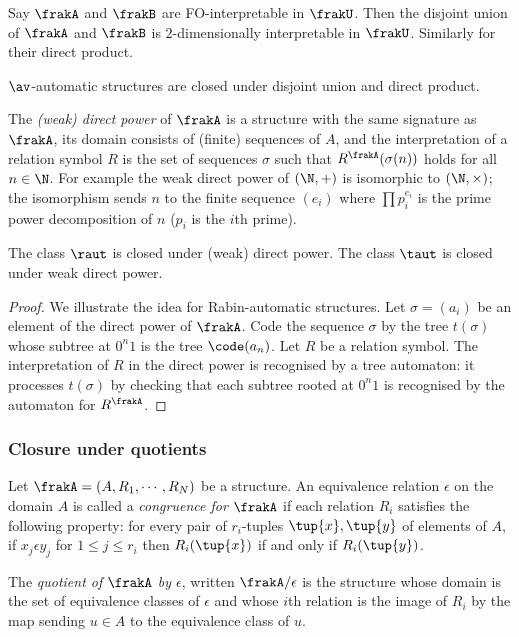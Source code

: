 Say $\frakA$ and $\frakB$ are FO-interpretable in $\frakU$. Then the disjoint union of $\frakA$ and $\frakB$ is $2$-dimensionally interpretable in $\frakU$. Similarly for their direct product.

\begin{corollary}
$\av$-automatic structures are closed under disjoint union and direct product.
\end{corollary}

The {\em (weak) direct power} of $\frakA$ is a structure with the same signature as $\frakA$, its domain consists 
of (finite) sequences of $A$, and the 
interpretation of a relation symbol $R$ is the set of sequences $\sigma$ such that $R^\frakA(\sigma(n))$ holds for all $n \in \N$.
For example the weak direct power of $(\N,+)$ is isomorphic to $(\N,\times)$; the isomorphism sends $n$ to  the finite sequence $(e_i)$ where
$ \prod p_i^{e_i}$ is the prime power decomposition of $n$ ($p_i$ is the $i$th prime).
 
\begin{proposition}
The class $\raut$ is closed under (weak) direct power. The class $\taut$ is closed under weak direct power.
\end{proposition}

\begin{proof}
We illustrate the idea for Rabin-automatic structures.
Let $\sigma = (a_i)$ be an element of the direct power of $\frakA$.
Code the sequence $\sigma$ by the tree $t(\sigma)$ whose subtree at $0^n1$ is the tree $\code(a_n)$.
Let $R$ be a relation symbol. The interpretation of $R$ in the direct power is recognised by a tree automaton: it  processes $t(\sigma)$ by checking
that each subtree rooted at $0^n1$ is recognised by the automaton for $R^\frakA$.
\end{proof}

\subsubsection{Closure under quotients} \label{AS:subsub:quotient}
Let $\frakA = ({A},R_1,\cdots,R_N)$ be a structure.
An equivalence relation $\epsilon$ on the domain ${A}$ is called a {\em congruence for $\frakA$} if each relation $R_i$ satisfies the following property:
for every pair of $r_i$-tuples $\tup{x},\tup{y}$ of elements of ${A}$, if $x_j \epsilon y_j$ for $1 \leq j \leq r_i$ then $R_i(\tup{x})$ if and only if $R_i(\tup{y})$.

The {\em quotient of $\frakA$ by $\epsilon$}, written $\frakA/\epsilon$ is the structure whose domain is the set of equivalence classes of $\epsilon$ and whose $i$th relation
is the image of $R_i$ by the map sending $u \in {A}$ to the equivalence class of $u$.

